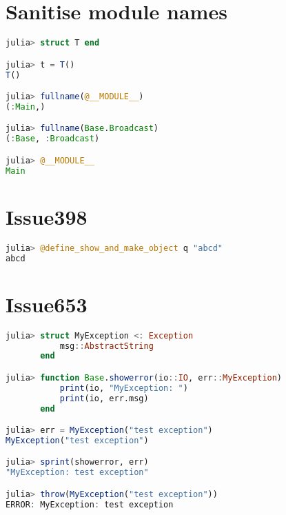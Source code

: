 \chapter{Sanitise module names}



\label{10742780047906711446}{}



\begin{lstlisting}[language=julia, style=jlcodestyle]
julia> struct T end

julia> t = T()
T()

julia> fullname(@__MODULE__)
(:Main,)

julia> fullname(Base.Broadcast)
(:Base, :Broadcast)

julia> @__MODULE__
Main
\end{lstlisting}



\chapter{Issue398}



\label{2549498190252584856}{}





\begin{lstlisting}[language=julia, style=jlcodestyle]
julia> @define_show_and_make_object q "abcd"
abcd
\end{lstlisting}





\chapter{Issue653}



\label{1744747689002493869}{}



\begin{lstlisting}[language=julia, style=jlcodestyle]
julia> struct MyException <: Exception
           msg::AbstractString
       end

julia> function Base.showerror(io::IO, err::MyException)
           print(io, "MyException: ")
           print(io, err.msg)
       end

julia> err = MyException("test exception")
MyException("test exception")

julia> sprint(showerror, err)
"MyException: test exception"

julia> throw(MyException("test exception"))
ERROR: MyException: test exception
\end{lstlisting}



